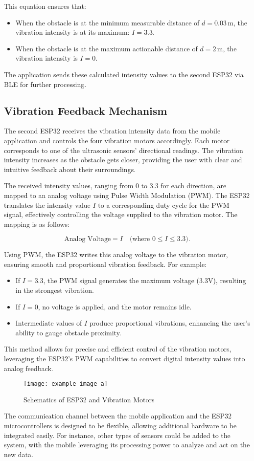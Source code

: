 This equation ensures that:
\begin{itemize}
	\item When the obstacle is at the minimum measurable distance of \(d = 0.03 \, \text{m}\), the vibration intensity is at its maximum: \(I = 3.3\).
	\item When the obstacle is at the maximum actionable distance of \(d = 2 \, \text{m}\), the vibration intensity is \(I = 0\).
\end{itemize}

The application sends these calculated intensity values to the second ESP32 via BLE for further processing.

\subsection{Vibration Feedback Mechanism}

The second ESP32 receives the vibration intensity data from the mobile application and controls the four vibration motors accordingly. Each motor corresponds to one of the ultrasonic sensors' directional readings. The vibration intensity increases as the obstacle gets closer, providing the user with clear and intuitive feedback about their surroundings.

The received intensity values, ranging from 0 to 3.3 for each direction, are mapped to an analog voltage using Pulse Width Modulation (PWM). The ESP32 translates the intensity value \(I\) to a corresponding duty cycle for the PWM signal, effectively controlling the voltage supplied to the vibration motor. The mapping is as follows:

\[
\text{Analog Voltage} = I \quad \text{(where \(0 \leq I \leq 3.3\))}.
\]

Using PWM, the ESP32 writes this analog voltage to the vibration motor, ensuring smooth and proportional vibration feedback. For example:
\begin{itemize}
	\item If \(I = 3.3\), the PWM signal generates the maximum voltage (3.3V), resulting in the strongest vibration.
	\item If \(I = 0\), no voltage is applied, and the motor remains idle.
	\item Intermediate values of \(I\) produce proportional vibrations, enhancing the user's ability to gauge obstacle proximity.
\end{itemize}

This method allows for precise and efficient control of the vibration motors, leveraging the ESP32's PWM capabilities to convert digital intensity values into analog feedback.

\begin{figure}[h]
	\centering
	\texttt{[image: example-image-a]}
	\caption{Schematics of ESP32 and Vibration Motors}
	\label{fig:schematic_esp_vibration}
\end{figure}

The communication channel between the mobile application and the ESP32 microcontrollers is designed to be flexible, allowing additional hardware to be integrated easily. For instance, other types of sensors could be added to the system, with the mobile leveraging its processing power to analyze and act on the new data.
